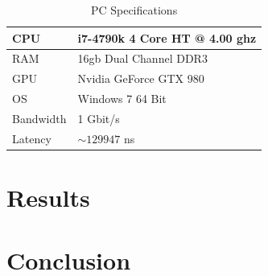 \documentclass[journal,transmag]{IEEEtran}
\begin{document}
\begin{table}[]
	\centering
	\caption{PC Specifications}
	\label{pcSpecsTable}
	\begin{tabular}{|l|l|}
		\hline
		CPU & i7-4790k 4 Core HT @ 4.00 ghz \\ \hline
		RAM & 16gb Dual Channel DDR3        \\ \hline
		GPU & Nvidia GeForce GTX 980        \\ \hline
		OS  & Windows 7 64 Bit              \\ \hline
		Bandwidth & 1 Gbit/s  				\\ \hline
		Latency   & $\sim129947$ ns 		\\ \hline
	\end{tabular}
\end{table}
		
\newpage


\section{Results}
	
\section{Conclusion}
	
\appendices



\nocite{Williams:1483005}
\end{document}
